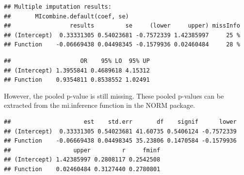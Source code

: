 \documentclass[]{book}
\newenvironment{Shaded}{\begin{snugshade}}{\end{snugshade}}
\newcommand{\KeywordTok}[1]{\textcolor[rgb]{0.13,0.29,0.53}{\textbf{#1}}}
\newcommand{\DataTypeTok}[1]{\textcolor[rgb]{0.13,0.29,0.53}{#1}}
\newcommand{\DecValTok}[1]{\textcolor[rgb]{0.00,0.00,0.81}{#1}}
\newcommand{\StringTok}[1]{\textcolor[rgb]{0.31,0.60,0.02}{#1}}
\newcommand{\ControlFlowTok}[1]{\textcolor[rgb]{0.13,0.29,0.53}{\textbf{#1}}}
\newcommand{\OperatorTok}[1]{\textcolor[rgb]{0.81,0.36,0.00}{\textbf{#1}}}
\newcommand{\NormalTok}[1]{#1}
\theoremstyle{definition}
\theoremstyle{definition}
\theoremstyle{definition}
\theoremstyle{remark}
\begin{document}
\begin{verbatim}
## Multiple imputation results:
##       MIcombine.default(coef, se)
##                 results         se     (lower     upper) missInfo
## (Intercept)  0.33331305 0.54023681 -0.7572339 1.42385997     25 %
## Function    -0.06669438 0.04498345 -0.1579936 0.02460484     28 %
\end{verbatim}

\begin{Shaded}
\end{Shaded}

\begin{verbatim}
##                    OR    95% LO  95% UP
## (Intercept) 1.3955841 0.4689618 4.15312
## Function    0.9354811 0.8538552 1.02491
\end{verbatim}

However, the pooled p-value is still missing. These pooled p-values can
be extracted from the mi.inference function in the NORM package.

\begin{Shaded}
\end{Shaded}

\begin{verbatim}
##                     est    std.err       df    signif      lower
## (Intercept)  0.33331305 0.54023681 41.60735 0.5406124 -0.7572339
## Function    -0.06669438 0.04498345 35.23806 0.1470584 -0.1579936
##                  upper         r     fminf
## (Intercept) 1.42385997 0.2808117 0.2542508
## Function    0.02460484 0.3127440 0.2780801
\end{verbatim}
\end{document}
